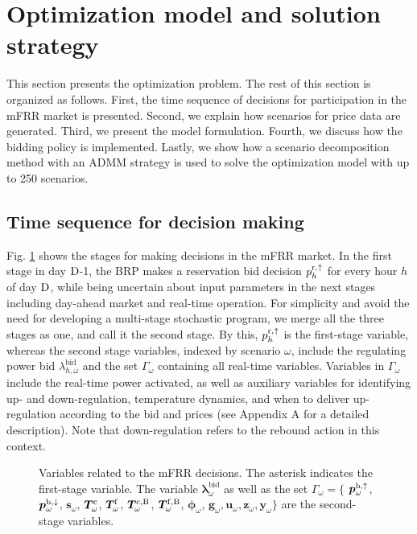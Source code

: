 \section{Optimization model and solution strategy}\label{sec:OptimizationModel}
%
This section presents the optimization problem. The rest of this section is organized as follows. First, the time sequence of decisions for participation in the mFRR market is presented. Second, we explain how scenarios for price data are generated. Third, we present the model formulation. Fourth, we discuss how the bidding policy is implemented. Lastly, we show how a scenario decomposition method with an ADMM strategy is used to solve the optimization model with up to 250 scenarios.

\vspace{-1mm}
\subsection{Time sequence for decision making}
Fig. \ref{fig:timeline_mfrr_variables} shows the stages for making decisions in the mFRR market. In the first stage in day $\rm{D}$-1, the BRP makes a reservation bid decision $p_{h}^{\rm{r},\uparrow}$ for every hour $h$ of day $\rm{D}$,  while being uncertain about input parameters in the next stages including day-ahead market and real-time operation. For simplicity and avoid the need for developing a multi-stage stochastic program, we merge all the three stages as one, and call it the second stage. By this, $p_{h}^{\rm{r},\uparrow}$ is the first-stage variable, whereas the second stage variables, indexed by scenario $\omega$, include
the regulating power bid $\lambda_{h,\omega}^{\text{bid}}$ and the set $\Gamma_{\omega}$ containing all real-time variables. Variables in $\Gamma_{\omega}$ include the real-time power activated, as well as auxiliary variables for identifying up- and down-regulation,  temperature dynamics, and when to deliver up-regulation according to the bid and prices (see Appendix A for a detailed description). Note that down-regulation refers to the rebound action in this context.

\begin{figure}[b]
    \centering
    
    \caption{Variables related to the mFRR  decisions. The asterisk indicates the first-stage variable.  The variable $\bm{\lambda}_{\omega}^{\text{bid}}$ as well as the set $\Gamma_{\omega} = \{ $ $\bm{p}_{\omega}^{\rm{b},\uparrow}$, $\bm{p}_{\omega}^{\rm{b},\downarrow}$, $\bm{s}_{\omega}$, $\bm{T}_{\omega}^{\rm{c}}$, $\bm{T}_{\omega}^{\rm{f}}$, $\bm{T}_{\omega}^{\rm{c,B}}$, $\bm{T}_{\omega}^{\rm{f,B}}$, $\bm{\phi}_{\omega}$, $\bm{g}_{\omega}, \bm{u}_{\omega}, \bm{z}_{\omega}, \bm{y}_{\omega} \}$ are the second-stage  variables.}
    \label{fig:timeline_mfrr_variables}
\end{figure}

